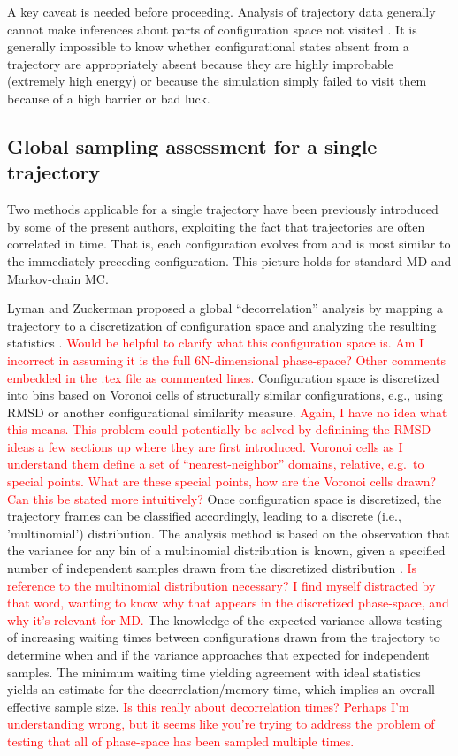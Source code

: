 A key caveat is needed before proceeding.
Analysis of trajectory data generally cannot make inferences about parts of configuration space not visited \cite{Grossfield2009}.
It is generally impossible to know whether configurational states absent from a trajectory are appropriately absent because they are highly improbable (extremely high energy) or because the simulation simply failed to visit them because of a high barrier or bad luck.

\subsection{Global sampling assessment for a single trajectory}
Two methods applicable for a single trajectory have been previously introduced by some of the present authors, exploiting the fact that trajectories are often correlated in time.
That is, each configuration evolves from and is most similar to the immediately preceding configuration.
This picture holds for standard MD and Markov-chain MC.

Lyman and Zuckerman proposed a global ``decorrelation'' analysis by mapping a trajectory to a discretization of configuration space and analyzing the resulting statistics \cite{Lyman2007a}.  
\textcolor{red}{Would be helpful to clarify what this configuration space is.  Am I incorrect in assuming it is the full 6N-dimensional phase-space?  Other comments embedded in the .tex file as commented lines.}
Configuration space is discretized into bins based on Voronoi cells of structurally similar configurations,  e.g., using RMSD or another configurational similarity measure.
\textcolor{red}{Again, I have no idea what this means.  This problem could potentially be solved by definining the RMSD ideas a few sections up where they are first introduced.  Voronoi cells as I understand them define a set of ``nearest-neighbor'' domains, relative, e.g.\ to special points.  What are these special points, how are the Voronoi cells drawn?  Can this be stated more intuitively?}
Once configuration space is discretized, the trajectory frames can be classified accordingly, leading to a discrete (i.e., 'multinomial') distribution.
The analysis method is based on the observation that the variance for any bin of a multinomial distribution is known, given a specified number of independent samples drawn from the discretized distribution \cite{Lyman2007a}.
\textcolor{red}{Is reference to the multinomial distribution necessary?  I find myself distracted by that word, wanting to know why that appears in the discretized phase-space, and why it's relevant for MD.}
The knowledge of the expected variance allows testing of increasing waiting times between configurations drawn from the trajectory to determine when and if the variance approaches that expected for independent samples.
The minimum waiting time yielding agreement with ideal statistics yields an estimate for the decorrelation/memory time, which implies an overall effective sample size. \textcolor{red}{Is this really about decorrelation times?  Perhaps I'm understanding wrong, but it seems like you're trying to address the problem of testing that all of phase-space has been sampled multiple times.}



